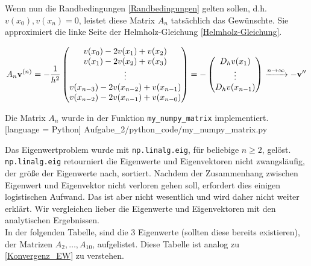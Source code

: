 Wenn nun die Randbedingungen \eqref{Randbedingungen} gelten sollen, d.h. $v(x_0), v(x_n) = 0$, leistet diese Matrix $A_n$ tatsächlich das Gewünschte. Sie approximiert die linke Seite der Helmholz-Gleichung \eqref{Helmholz-Gleichung}.

\begin{align*}
  A_n \mathbf{v}^{(n)} =
  -\frac{1}{h^2}
  \begin{pmatrix}
    v(x_0) - 2 v(x_1) + v(x_2)             \\
    v(x_1) - 2 v(x_2) + v(x_3)             \\
    \vdots                                 \\
    v(x_{n-3}) - 2 v(x_{n-2}) + v(x_{n-1}) \\
    v(x_{n-2}) - 2 v(x_{n-1}) + v(x_{n-0})
  \end{pmatrix} =
  -\begin{pmatrix}
    D_h v(x_1) \\
    \vdots     \\
    D_h v(x_{n-1})
  \end{pmatrix}
  \xrightarrow{n \to \infty}
  -\mathbf{v}^{\prime \prime}
\end{align*}

Die Matrix $A_n$ wurde in der Funktion \verb|my_numpy_matrix| implementiert. \\


[language = Python]
{Aufgabe_2/python_code/my_numpy_matrix.py}
\vspace{10pt}

Das Eigenwertproblem wurde mit \verb|np.linalg.eig|, für beliebige $n \geq 2$, gelöst. \verb|np.linalg.eig| retourniert die Eigenwerte und Eigenvektoren nicht zwangsläufig, der größe der Eigenwerte nach, sortiert. Nachdem der Zusammenhang zwischen Eigenwert und Eigenvektor nicht verloren gehen soll, erfordert dies einigen logistischen Aufwand. Das ist aber nicht wesentlich und wird daher nicht weiter erklärt. Wir vergleichen lieber die Eigenwerte und Eigenvektoren mit den analytischen Ergebnissen. \\

In der folgenden Tabelle, sind die $3$ Eigenwerte (sollten diese bereits existieren), der Matrizen $A_2, \ldots, A_{10}$, aufgelistet. Diese Tabelle ist analog zu \eqref{Konvergenz_EW} zu verstehen. \\


\vspace{10pt}

